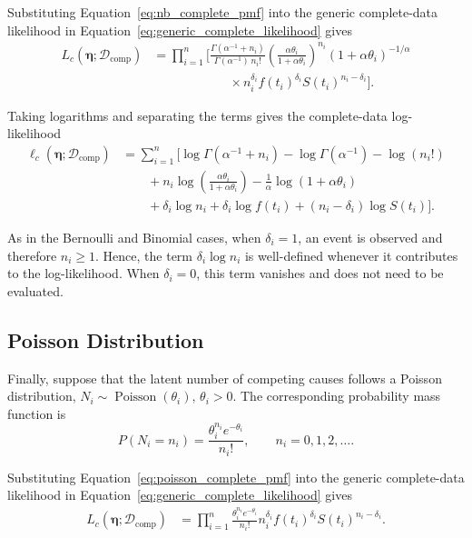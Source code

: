 Substituting Equation~\eqref{eq:nb_complete_pmf} into the generic
complete-data likelihood in Equation~\eqref{eq:generic_complete_likelihood}
gives
\begin{align}
L_c
\left(
\boldsymbol{\eta};
\mathcal{D}_{\mathrm{comp}}
\right)
&=
\prod_{i=1}^n
\Bigg[
\frac{
\Gamma(\alpha^{-1}+n_i)
}{
\Gamma(\alpha^{-1})\,n_i!
}
\left(
\frac{\alpha\theta_i}
{1+\alpha\theta_i}
\right)^{n_i}
(1+\alpha\theta_i)^{-1/\alpha}
\nonumber\\
&\qquad\qquad\qquad
\times
n_i^{\delta_i}
f(t_i)^{\delta_i}
S(t_i)^{n_i-\delta_i}
\Bigg].
\label{eq:nb_complete_likelihood}
\end{align}

Taking logarithms and separating the terms gives the complete-data
log-likelihood
\begin{align}
\ell_c
\left(
\boldsymbol{\eta};
\mathcal{D}_{\mathrm{comp}}
\right)
&=
\sum_{i=1}^n
\Bigg[
\log\Gamma(\alpha^{-1}+n_i)
-
\log\Gamma(\alpha^{-1})
-
\log(n_i!)
\nonumber\\
&\qquad
+
n_i
\log\left(
\frac{\alpha\theta_i}
{1+\alpha\theta_i}
\right)
-
\frac{1}{\alpha}
\log(1+\alpha\theta_i)
\nonumber\\
&\qquad
+
\delta_i\log n_i
+
\delta_i\log f(t_i)
+
(n_i-\delta_i)\log S(t_i)
\Bigg].
\label{eq:nb_complete_loglikelihood}
\end{align}

As in the Bernoulli and Binomial cases, when $\delta_i=1$, an event is
observed and therefore $n_i\geq1$. Hence, the term
$\delta_i\log n_i$ is well-defined whenever it contributes to the
log-likelihood. When $\delta_i=0$, this term vanishes and does not need
to be evaluated.

\subsection{Poisson Distribution}

Finally, suppose that the latent number of competing causes follows a
Poisson distribution, $N_i\sim\operatorname{Poisson}(\theta_i)\text{, } \theta_i>0$.
The corresponding probability mass function is
\begin{equation}
P(N_i=n_i)
=
\frac{\theta_i^{n_i}e^{-\theta_i}}{n_i!},
\qquad
n_i=0,1,2,\ldots.
\label{eq:poisson_complete_pmf}
\end{equation}

Substituting Equation~\eqref{eq:poisson_complete_pmf} into the generic
complete-data likelihood in Equation~\eqref{eq:generic_complete_likelihood}
gives
\begin{align}
L_c
\left(
\boldsymbol{\eta};
\mathcal{D}_{\mathrm{comp}}
\right)
&=
\prod_{i=1}^n
\frac{\theta_i^{n_i}e^{-\theta_i}}{n_i!}
n_i^{\delta_i}
f(t_i)^{\delta_i}
S(t_i)^{n_i-\delta_i}.
\label{eq:poisson_complete_likelihood}
\end{align}

